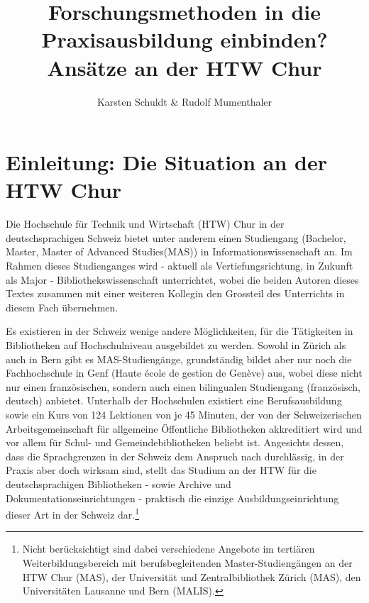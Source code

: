 \documentclass[a4paper,
fontsize=11pt,
oneside,
numbers=noperiodatend,
parskip=half-,
bibliography=totoc,
final
]{scrartcl}
\title{\LARGE{Forschungsmethoden in die Praxisausbildung einbinden? Ansätze an der HTW Chur}} %
\author{Karsten Schuldt \& Rudolf Mumenthaler} %
\date{}
\begin{document}
\maketitle
\thispagestyle{fancyplain} 


\section*{Einleitung: Die Situation an der HTW
Chur}\label{einleitung-die-situation-an-der-htw-chur}

Die Hochschule für Technik und Wirtschaft (HTW) Chur in der
deutschsprachigen Schweiz bietet unter anderem einen Studiengang
(Bachelor, Master, Master of Advanced Studies(MAS)) in
Informationswissenschaft an. Im Rahmen dieses Studienganges wird -
aktuell als Vertiefungsrichtung, in Zukunft als Major -
Bibliothekswissenschaft unterrichtet, wobei die beiden Autoren dieses
Textes zusammen mit einer weiteren Kollegin den Grossteil des
Unterrichts in diesem Fach übernehmen.

Es existieren in der Schweiz wenige andere Möglichkeiten, für die
Tätigkeiten in Bibliotheken auf Hochschulniveau ausgebildet zu werden.
Sowohl in Zürich als auch in Bern gibt es MAS-Studiengänge, grundständig
bildet aber nur noch die Fachhochschule in Genf (Haute école de gestion
de Genève) aus, wobei diese nicht nur einen französischen, sondern auch
einen bilingualen Studiengang (französisch, deutsch) anbietet. Unterhalb
der Hochschulen existiert eine Berufsausbildung sowie ein Kurs von 124
Lektionen von je 45 Minuten, der von der Schweizerischen
Arbeitsgemeinschaft für allgemeine Öffentliche Bibliotheken akkreditiert
wird und vor allem für Schul- und Gemeindebibliotheken beliebt ist.
Angesichts dessen, dass die Sprachgrenzen in der Schweiz dem Anspruch
nach durchlässig, in der Praxis aber doch wirksam sind, stellt das
Studium an der HTW für die deutschsprachigen Bibliotheken - sowie
Archive und Dokumentationseinrichtungen - praktisch die einzige
Ausbildungseinrichtung dieser Art in der Schweiz dar.\footnote{Nicht
  berücksichtigt sind dabei verschiedene Angebote im tertiären
  Weiterbildungsbereich mit berufsbegleitenden Master-Studiengängen an
  der HTW Chur (MAS), der Universität und Zentralbibliothek Zürich
  (MAS), den Universitäten Lausanne und Bern (MALIS).}
\end{document}
